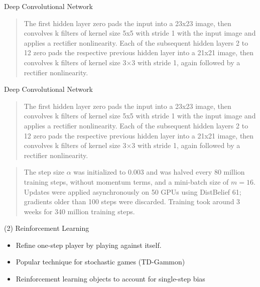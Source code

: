 \documentclass{beamer}
\begin{document}
\begin{frame}{Deep Convolutional Network}
  \begin{quote}
    The first hidden layer zero pads the input into a 23x23 image, then convolves k filters of kernel size 5x5 with stride
1 with the input image and applies a rectifier nonlinearity. Each of the subsequent
hidden layers 2 to 12 zero pads the respective previous hidden layer into a 21x21
image, then convolves k filters of kernel size 3×3 with stride 1, again followed
by a rectifier nonlinearity. 
  \end{quote}
\end{frame}

\begin{frame}{Deep Convolutional Network}
  \begin{quote}
    The first hidden layer zero pads the input into a 23x23 image, then convolves k filters of kernel size 5x5 with stride
1 with the input image and applies a rectifier nonlinearity. Each of the subsequent
hidden layers 2 to 12 zero pads the respective previous hidden layer into a 21x21
image, then convolves k filters of kernel size 3×3 with stride 1, again followed
by a rectifier nonlinearity. 
  \end{quote}
\end{frame}


\begin{frame}
  \begin{quote}
     The step size $\alpha$ was initialized to 0.003 and was halved
every 80 million training steps, without momentum terms, and a mini-batch size
of $m=16$. Updates were applied asynchronously on 50 GPUs using DistBelief 61;
gradients older than 100 steps were discarded. Training took around 3 weeks for
340 million training steps.
  \end{quote}
\end{frame}


\begin{frame}{(2) Reinforcement Learning}


  \begin{itemize}
  \item Refine one-step player by playing against itself. 
    \air 
  \item Popular technique for stochastic games (TD-Gammon)
    \air
  \item Reinforcement learning objects to account for single-step bias
  \end{itemize}
\end{frame}
\end{document}
